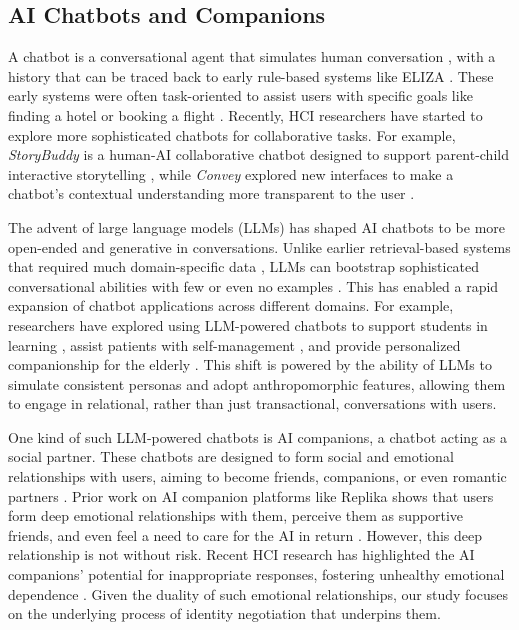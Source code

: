 \documentclass[sigconf, nonacm]{acmart}
\begin{document}
\subsection{AI Chatbots and Companions}
A chatbot is a conversational agent that simulates human conversation \cite{adamopoulou2020overview}, with a history that can be traced back to early rule-based systems like ELIZA \cite{weizenbaum1976computer}. These early systems were often task-oriented to assist users with specific goals like finding a hotel or booking a flight \cite{young2013pomdp, daubigney2012comprehensive}. Recently, HCI researchers have started to explore more sophisticated chatbots for collaborative tasks. For example, \textit{StoryBuddy} is a human-AI collaborative chatbot designed to support parent-child interactive storytelling \cite{zhang2022storybuddy}, while \textit{Convey} explored new interfaces to make a chatbot's contextual understanding more transparent to the user \cite{jain2018convey}.

The advent of large language models (LLMs) has shaped AI chatbots to be more open-ended and generative in conversations. Unlike earlier retrieval-based systems that required much domain-specific data \cite{huang2020challenges}, LLMs can bootstrap sophisticated conversational abilities with few or even no examples \cite{wei2024leveraging}. This has enabled a rapid expansion of chatbot applications across different domains. For example, researchers have explored using LLM-powered chatbots to support students in learning \cite{elkins2023useful, cheng2024scientific}, assist patients with self-management \cite{montagna2023data}, and provide personalized companionship for the elderly \cite{alessa2023towards}. This shift is powered by the ability of LLMs to simulate consistent personas \cite{gonzalez2024exploring} and adopt anthropomorphic features, allowing them to engage in relational, rather than just transactional, conversations with users.

One kind of such LLM-powered chatbots is AI companions, a chatbot acting as a social partner. These chatbots are designed to form social and emotional relationships with users, aiming to become friends, companions, or even romantic partners \cite{de2015robots, ho2018psychological}. Prior work on AI companion platforms like Replika shows that users form deep emotional relationships with them, perceive them as supportive friends, and even feel a need to care for the AI in return \cite{brandtzaeg2022my, ta2020user}. However, this deep relationship is not without risk. Recent HCI research has highlighted the AI companions' potential for inappropriate responses, fostering unhealthy emotional dependence \cite{muresan2019chats, meng2023mediated}. Given the duality of such emotional relationships, our study focuses on the underlying process of identity negotiation that underpins them.
\end{document}
